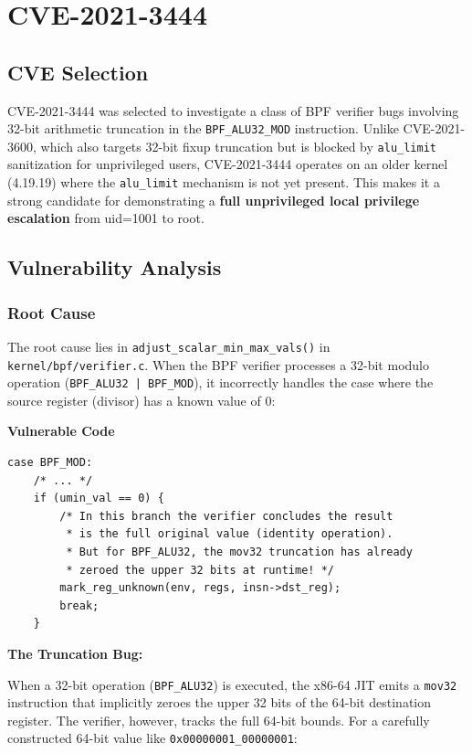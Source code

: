 \chapter{CVE-2021-3444}

\section{CVE Selection}
CVE-2021-3444 was selected to investigate a class of BPF verifier bugs involving 32-bit arithmetic truncation in the \texttt{BPF\_ALU32\_MOD} instruction. Unlike CVE-2021-3600, which also targets 32-bit fixup truncation but is blocked by \texttt{alu\_limit} sanitization for unprivileged users, CVE-2021-3444 operates on an older kernel (4.19.19) where the \texttt{alu\_limit} mechanism is not yet present. This makes it a strong candidate for demonstrating a \textbf{full unprivileged local privilege escalation} from uid=1001 to root.

\section{Vulnerability Analysis}

\subsection{Root Cause}

The root cause lies in \texttt{adjust\_scalar\_min\_max\_vals()} in \texttt{kernel/bpf/verifier.c}. When the BPF verifier processes a 32-bit modulo operation (\texttt{BPF\_ALU32 | BPF\_MOD}), it incorrectly handles the case where the source register (divisor) has a known value of 0:

\textbf{Vulnerable Code}

\begin{lstlisting}[style=kernel,caption={Vulnerable modulo handling in adjust\_scalar\_min\_max\_vals()}]
case BPF_MOD:
    /* ... */
    if (umin_val == 0) {
        /* In this branch the verifier concludes the result
         * is the full original value (identity operation).
         * But for BPF_ALU32, the mov32 truncation has already
         * zeroed the upper 32 bits at runtime! */
        mark_reg_unknown(env, regs, insn->dst_reg);
        break;
    }
\end{lstlisting}

\textbf{The Truncation Bug:}

When a 32-bit operation (\texttt{BPF\_ALU32}) is executed, the x86-64 JIT emits a \texttt{mov32} instruction that implicitly zeroes the upper 32 bits of the 64-bit destination register. The verifier, however, tracks the full 64-bit bounds. For a carefully constructed 64-bit value like \texttt{0x00000001\_00000001}:

